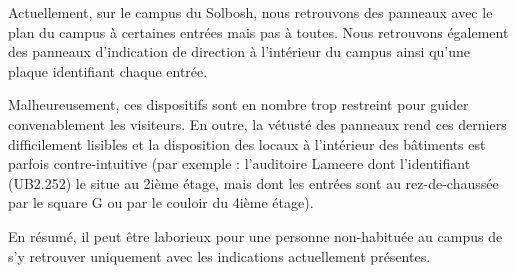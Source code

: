 Actuellement, sur le campus du Solbosh,  nous retrouvons  des panneaux  avec le plan du campus  à certaines entrées  mais pas à toutes. Nous retrouvons également des panneaux d'indication de direction à l’intérieur du campus ainsi qu’une plaque identifiant chaque entrée. 

Malheureusement, ces dispositifs sont en nombre trop restreint  pour guider convenablement les visiteurs. En outre, la vétusté  des panneaux rend ces derniers difficilement lisibles et la disposition des locaux à l’intérieur des bâtiments est parfois contre-intuitive (par exemple : l’auditoire Lameere  dont l’identifiant (UB2.252) le situe au 2ième étage, mais dont les entrées sont au rez-de-chaussée par le square  G ou par le couloir du 4ième étage).  

En résumé, il peut  être laborieux pour une personne non-habituée  au campus de s’y retrouver uniquement avec  les indications actuellement présentes. 


 
